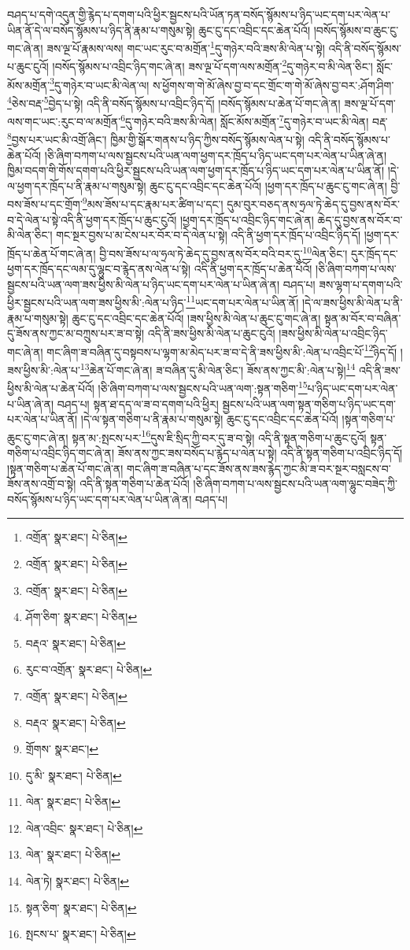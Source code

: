 བཤད་པ་དགེ་འདུན་གྱི་རྙེད་པ་དགག་པའི་ཕྱིར་སྦྱངས་པའི་ཡོན་ཏན་བསོད་སྙོམས་པ་ཉིད་ཡང་དག་པར་ལེན་པ་ཡིན་ནོ་དེ་ལ་བསོད་སྙོམས་པ་ཉིད་ནི་རྣམ་པ་གསུམ་སྟེ། ཆུང་ངུ་དང་འབྲིང་དང་ཆེན་པོའོ། །བསོད་སྙོམས་བ་ཆུང་ངུ་གང་ཞེ་ན། ཟས་ལྔ་པོ་རྣམས་ལས། གང་ཡང་རུང་བ་མགྲོན་\footnote{འགྲོན་  སྣར་ཐང་།  པེ་ཅིན། }དུ་གཉེར་བའི་ཟས་མི་ལེན་པ་སྟེ། འདི་ནི་བསོད་སྙོམས་པ་ཆུང་ངུའོ། །བསོད་སྙོམས་པ་འབྲིང་ཉིད་གང་ཞེ་ན། ཟས་ལྔ་པོ་དག་ལས་མགྲོན་\footnote{འགྲོན་  སྣར་ཐང་།  པེ་ཅིན། }དུ་གཉེར་བ་མི་ལེན་ཅིང་། སློང་མོས་མགྲོན་\footnote{འགྲོན་  སྣར་ཐང་།  པེ་ཅིན། }དུ་གཉེར་བ་ཡང་མི་ལེན་ལ། ས་ཕྱོགས་ག་གེ་མོ་ཞེས་བྱ་བ་དང་གྲོང་ག་གེ་མོ་ཞེས་བྱ་བར་:ཤོག་ཤིག་\footnote{ཤོག་ཅིག་  སྣར་ཐང་།  པེ་ཅིན། }ཅེས་བརྡ་\footnote{བརྡའ་  སྣར་ཐང་།  པེ་ཅིན། }བྱེད་པ་སྟེ། འདི་ནི་བསོད་སྙོམས་པ་འབྲིང་ཉིད་དོ། །བསོད་སྙོམས་པ་ཆེན་པོ་གང་ཞེ་ན། ཟས་ལྔ་པོ་དག་ལས་གང་ཡང་:རུང་བ་ལ་མགྲོན་\footnote{རུང་བ་འགྲོན་  སྣར་ཐང་།  པེ་ཅིན། }དུ་གཉེར་བའི་ཟས་མི་ལེན། སློང་མོས་མགྲོན་\footnote{འགྲོན་  སྣར་ཐང་།  པེ་ཅིན། }དུ་གཉེར་བ་ཡང་མི་ལེན། བརྡ་\footnote{བརྡའ་  སྣར་ཐང་།  པེ་ཅིན། }བྱས་པར་ཡང་མི་འགྲོ་ཞིང་། ཁྱིམ་གྱི་སྒོར་གནས་པ་ཉིད་ཀྱིས་བསོད་སྙོམས་ལེན་པ་སྟེ། འདི་ནི་བསོད་སྙོམས་པ་ཆེན་པོའོ། །ཅི་ཞིག་བཀག་པ་ལས་སྦྱངས་པའི་ཡན་ལག་ཕྱག་དར་ཁྲོད་པ་ཉིད་ཡང་དག་པར་ལེན་པ་ཡིན་ཞེ་ན། ཁྱིམ་བདག་གི་གོས་དགག་པའི་ཕྱིར་སྦྱངས་པའི་ཡན་ལག་ཕྱག་དར་ཁྲོད་པ་ཉིད་ཡང་དག་པར་ལེན་པ་ཡིན་ནོ། །དེ་ལ་ཕྱག་དར་ཁྲོད་པ་ནི་རྣམ་པ་གསུམ་སྟེ། ཆུང་ངུ་དང་འབྲིང་དང་ཆེན་པོའོ། །ཕྱག་དར་ཁྲོད་པ་ཆུང་ངུ་གང་ཞེ་ན། བྱི་བས་ཟོས་པ་དང་གྲོག་\footnote{གྲོགས་  སྣར་ཐང་། }མས་ཟོས་པ་དང་རྣམ་པར་ཚིག་པ་དང་། དུམ་བུར་བཅད་ནས་ཧྲལ་ཏེ་ཆེད་དུ་བྱས་ནས་བོར་བ་དེ་ལེན་པ་སྟེ་འདི་ནི་ཕྱག་དར་ཁྲོད་པ་ཆུང་ངུའོ། །ཕྱག་དར་ཁྲོད་པ་འབྲིང་ཉིད་གང་ཞེ་ན། ཆེད་དུ་བྱས་ནས་བོར་བ་མི་ལེན་ཅིང་། གང་སྔར་བྱས་པ་མ་ངེས་པར་བོར་བ་དེ་ལེན་པ་སྟེ། འདི་ནི་ཕྱག་དར་ཁྲོད་པ་འབྲིང་ཉིད་དོ། །ཕྱག་དར་ཁྲོད་པ་ཆེན་པོ་གང་ཞེ་ན། བྱི་བས་ཟོས་པ་ལ་ཧྲལ་ཏེ་ཆེད་དུ་བྱས་ནས་བོར་བའི་བར་དུ་\footnote{དུ་མི་  སྣར་ཐང་།  པེ་ཅིན། }ལེན་ཅིང་། དུར་ཁྲོད་དང་ཕྱག་དར་ཁྲོད་དང་ལམ་དུ་ལྷུང་བ་རྙེད་ནས་ལེན་པ་སྟེ། འདི་ནི་ཕྱག་དར་ཁྲོད་པ་ཆེན་པོའོ། །ཅི་ཞིག་བཀག་པ་ལས་སྦྱངས་པའི་ཡན་ལག་ཟས་ཕྱིས་མི་ལེན་པ་ཉིད་ཡང་དག་པར་ལེན་པ་ཡིན་ཞེ་ན། བཤད་པ། ཟས་ལྷག་པ་དགག་པའི་ཕྱིར་སྦྱངས་པའི་ཡན་ལག་ཟས་ཕྱིས་མི་:ལེན་པ་ཉིད་\footnote{ལེན་  སྣར་ཐང་།  པེ་ཅིན། }ཡང་དག་པར་ལེན་པ་ཡིན་ནོ། །དེ་ལ་ཟས་ཕྱིས་མི་ལེན་པ་ནི་རྣམ་པ་གསུམ་སྟེ། ཆུང་ངུ་དང་འབྲིང་དང་ཆེན་པོའོ། །ཟས་ཕྱིས་མི་ལེན་པ་ཆུང་ངུ་གང་ཞེ་ན། སྟན་མ་བོར་བ་བཞིན་དུ་ཟོས་ནས་ཀྱང་མ་བཀྲུས་པར་ཟ་བ་སྟེ། འདི་ནི་ཟས་ཕྱིས་མི་ལེན་པ་ཆུང་ངུའོ། །ཟས་ཕྱིས་མི་ལེན་པ་འབྲིང་ཉིད་གང་ཞེ་ན། གང་ཞིག་ཟ་བཞིན་དུ་བསྟབས་པ་ལྷག་མ་མེད་པར་ཟ་བ་དེ་ནི་ཟས་ཕྱིས་མི་:ལེན་པ་འབྲིང་པོ་\footnote{ལེན་འབྲིང་  སྣར་ཐང་།  པེ་ཅིན། }ཉིད་དོ། །ཟས་ཕྱིས་མི་:ལེན་པ་\footnote{ལེན་  སྣར་ཐང་།  པེ་ཅིན། }ཆེན་པོ་གང་ཞེ་ན། ཟ་བཞིན་དུ་མི་ལེན་ཅིང་། ཟོས་ནས་ཀྱང་མི་:ལེན་པ་སྟེ།\footnote{ལེན་ཏེ།  སྣར་ཐང་།  པེ་ཅིན། } འདི་ནི་ཟས་ཕྱིས་མི་ལེན་པ་ཆེན་པོའོ། །ཅི་ཞིག་བཀག་པ་ལས་སྦྱངས་པའི་ཡན་ལག་:སྟན་གཅིག་\footnote{སྟན་ཅིག་  སྣར་ཐང་།  པེ་ཅིན། }པ་ཉིད་ཡང་དག་པར་ལེན་པ་ཡིན་ཞེ་ན། བཤད་པ། སྟན་ཐ་དད་ལ་ཟ་བ་དགག་པའི་ཕྱིར། སྦྱངས་པའི་ཡན་ལག་སྟན་གཅིག་པ་ཉིད་ཡང་དག་པར་ལེན་པ་ཡིན་ནོ། །དེ་ལ་སྟན་གཅིག་པ་ནི་རྣམ་པ་གསུམ་སྟེ། ཆུང་ངུ་དང་འབྲིང་དང་ཆེན་པོའོ། །སྟན་གཅིག་པ་ཆུང་ངུ་གང་ཞེ་ན། སྟན་མ་:སྤངས་པར་\footnote{སྤངས་པ་  སྣར་ཐང་།  པེ་ཅིན། }དུས་ཇི་སྲིད་ཀྱི་བར་དུ་ཟ་བ་སྟེ། འདི་ནི་སྟན་གཅིག་པ་ཆུང་ངུའོ། སྟན་གཅིག་པ་འབྲིང་ཉིད་གང་ཞེ་ན། ཟོས་ནས་ཀྱང་ཟས་བསོད་པ་རྙེད་པ་ལེན་པ་སྟེ། འདི་ནི་སྟན་གཅིག་པ་འབྲིང་ཉིད་དོ། །སྟན་གཅིག་པ་ཆེན་པོ་གང་ཞེ་ན། གང་ཞིག་ཟ་བཞིན་པ་དང་ཟོས་ནས་ཟས་རྙེད་ཀྱང་མི་ཟ་བར་སྔར་བསླངས་བ་ཟོས་ནས་འགྲོ་བ་སྟེ། འདི་ནི་སྟན་གཅིག་པ་ཆེན་པོའོ། །ཅི་ཞིག་བཀག་པ་ལས་སྦྱངས་པའི་ཡན་ལག་ལྷུང་བཟེད་ཀྱི་བསོད་སྙོམས་པ་ཉིད་ཡང་དག་པར་ལེན་པ་ཡིན་ཞེ་ན། བཤད་པ། 